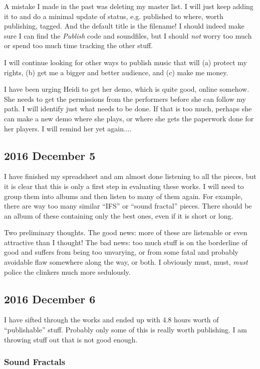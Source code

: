 \documentclass[english,11pt,letterpaper,onecolumn]{scrartcl}
\begin{document}
A mistake I made in the past was deleting my master list. I will just keep adding it to and do a minimal update of status, e.g. published to where, worth publishing, tagged. And the default title is the filename! I should indeed make sure I can find the \emph{Publish} code and soundfiles, but I should \emph{not} worry too much or spend too much time tracking the other stuff.

I will continue looking for other ways to publish music that will (a) protect my rights, (b) get me a bigger and better audience, and (c) make me money.

I have been urging Heidi to get her demo, which is quite good, online somehow. She needs to get the permissions from the performers before she can follow my path. I will identify just what needs to be done. If that is too much, perhaps she can make a new demo where she plays, or where she gets the paperwork done for her players. I will remind her yet again....

\subsection*{2016 December 5}

I have finished my spreadsheet and am almost done listening to all the pieces, but it is clear that this is only a first step in evaluating these works. I will need to group them into albums and then listen to many of them again. For example, there are way too many similar ``IFS'' or ``sound fractal'' pieces. There should be an album of these containing only the best ones, even if it is short or long.

Two preliminary thoughts. The good news: more of these are listenable or even attractive than I thought! The bad news: too much stuff is on the borderline of good and suffers from being too unvarying, or from some fatal and probably avoidable flaw somewhere along the way, or both. I obviously must, must, \emph{must} police the clinkers much more sedulously.

\subsection*{2016 December 6}

I have sifted through the works and ended up with 4.8 hours worth of ``publishable'' stuff. Probably only some of this is really worth publishing. I am throwing stuff out that is not good enough.

\subsubsection*{Sound Fractals}
\end{document}
